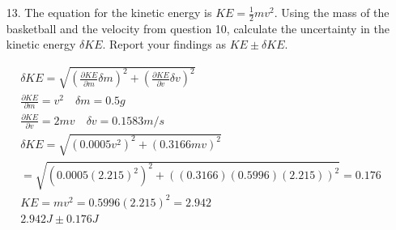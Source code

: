 \documentclass[12pt, letterpaper]{article}
\begin{document}
\begin{enumerate}
        \item[13.] The equation for the kinetic energy is $KE = \frac{1}{2}mv^{2}$. Using the mass of the basketball and the velocity from question 10, calculate the uncertainty in the kinetic energy $\delta KE$. Report your findings as $KE \pm \delta KE$.
        
        \begin{mdframed}
            \begin{equation*}
                \begin{gathered}
                    \delta KE = \sqrt{\left(\frac{\partial KE}{\partial m}\delta m\right)^{2} + \left(\frac{\partial KE}{\partial v}\delta v\right)^{2}}    \\
                    \frac{\partial KE}{\partial m} = v^{2} \quad \delta m = 0.5g        \\
                    \frac{\partial KE}{\partial v} = 2mv   \quad \delta v = 0.1583m/s   \\
                    \delta KE = \sqrt{\left(0.0005v^{2}\right)^{2} + \left(0.3166mv\right)^{2}}    \\
                              = \sqrt{(0.0005(2.215)^{2})^{2} + ((0.3166)(0.5996)(2.215))^{2}}
                              = 0.176    \\
                    KE = mv^{2} = 0.5996(2.215)^{2} = 2.942 \\
                    \boxed{2.942J \pm 0.176J}
                \end{gathered}
            \end{equation*}
        \end{mdframed}
    \end{enumerate}
\end{document}
